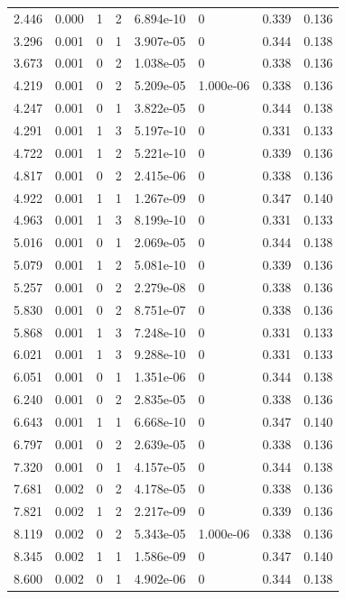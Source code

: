\documentclass[preview]{standalone}
\begin{document}
{{\begin{tabular}{L{1.2cm}C{1.2cm} C{0.3cm}C{0.5cm} C{1.4cm}C{1.4cm} C{1.4cm}C{1.4cm}}
  2.446  &  0.000  & 1     &  2 &  6.894e-10  & 0  & 0.339 &  0.136   \\ 
  3.296  &  0.001  & 0     &  1 &  3.907e-05  & 0  & 0.344 &  0.138   \\ 
  3.673  &  0.001  & 0     &  2 &  1.038e-05  & 0  & 0.338 &  0.136   \\ 
  4.219  &  0.001  & 0     &  2 &  5.209e-05  & 1.000e-06  & 0.338 &  0.136   \\ 
  4.247  &  0.001  & 0     &  1 &  3.822e-05  & 0  & 0.344 &  0.138   \\ 
  4.291  &  0.001  & 1     &  3 &  5.197e-10  & 0  & 0.331 &  0.133   \\ 
  4.722  &  0.001  & 1     &  2 &  5.221e-10  & 0  & 0.339 &  0.136   \\ 
  4.817  &  0.001  & 0     &  2 &  2.415e-06  & 0  & 0.338 &  0.136   \\ 
  4.922  &  0.001  & 1     &  1 &  1.267e-09  & 0  & 0.347 &  0.140   \\ 
  4.963  &  0.001  & 1     &  3 &  8.199e-10  & 0  & 0.331 &  0.133   \\ 
  5.016  &  0.001  & 0     &  1 &  2.069e-05  & 0  & 0.344 &  0.138   \\ 
  5.079  &  0.001  & 1     &  2 &  5.081e-10  & 0  & 0.339 &  0.136   \\ 
  5.257  &  0.001  & 0     &  2 &  2.279e-08  & 0  & 0.338 &  0.136   \\ 
  5.830  &  0.001  & 0     &  2 &  8.751e-07  & 0  & 0.338 &  0.136   \\ 
  5.868  &  0.001  & 1     &  3 &  7.248e-10  & 0  & 0.331 &  0.133   \\ 
  6.021  &  0.001  & 1     &  3 &  9.288e-10  & 0  & 0.331 &  0.133   \\ 
  6.051  &  0.001  & 0     &  1 &  1.351e-06  & 0  & 0.344 &  0.138   \\ 
  6.240  &  0.001  & 0     &  2 &  2.835e-05  & 0  & 0.338 &  0.136   \\ 
  6.643  &  0.001  & 1     &  1 &  6.668e-10  & 0  & 0.347 &  0.140   \\ 
  6.797  &  0.001  & 0     &  2 &  2.639e-05  & 0  & 0.338 &  0.136   \\ 
  7.320  &  0.001  & 0     &  1 &  4.157e-05  & 0  & 0.344 &  0.138   \\ 
  7.681  &  0.002  & 0     &  2 &  4.178e-05  & 0  & 0.338 &  0.136   \\ 
  7.821  &  0.002  & 1     &  2 &  2.217e-09  & 0  & 0.339 &  0.136   \\ 
  8.119  &  0.002  & 0     &  2 &  5.343e-05  & 1.000e-06  & 0.338 &  0.136   \\ 
  8.345  &  0.002  & 1     &  1 &  1.586e-09  & 0  & 0.347 &  0.140   \\ 
  8.600  &  0.002  & 0     &  1 &  4.902e-06  & 0  & 0.344 &  0.138   \\ 
\hline 
\end{tabular} 

}}
\end{document}
